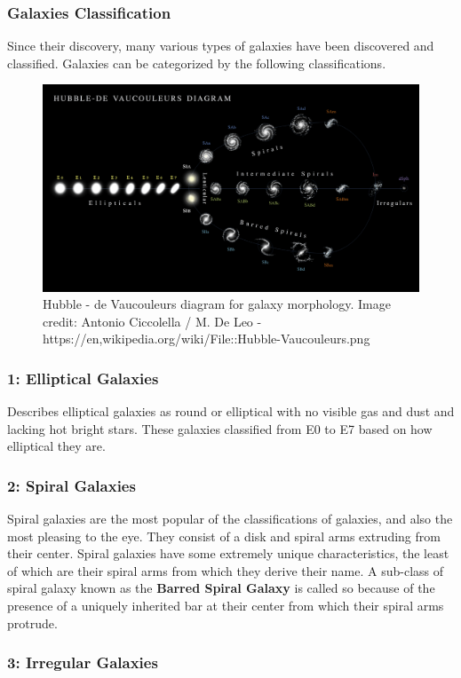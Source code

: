 \documentclass[12pt, oneside]{smuthesis}
\begin{document}
\subsubsection{\sc Galaxies Classification}
Since their discovery, many various types of galaxies have been discovered and classified. Galaxies can be categorized by the following classifications.
\begin{figure}
	\includegraphics[width=\textwidth]{GalaxyClassification}
	\caption{Hubble - de Vaucouleurs diagram for galaxy morphology. Image credit: Antonio Ciccolella / M. De Leo - https://en,wikipedia.org/wiki/File::Hubble-Vaucouleurs.png}
\end{figure}
\subsubsection{1: Elliptical Galaxies}
\cite{sag} Describes elliptical galaxies as round or elliptical with no visible gas and dust and lacking hot bright stars. These galaxies classified from E0 to E7 based on how elliptical they are.
\subsubsection{2: Spiral Galaxies}
Spiral galaxies are the most popular of the classifications of galaxies, and also the most pleasing to the eye. They consist of a disk and spiral arms extruding from their center. Spiral galaxies have some extremely unique characteristics, the least of which are their spiral arms from which they derive their name. A sub-class of spiral galaxy known as the \textbf{Barred Spiral Galaxy} is called so because of the presence of a uniquely inherited bar at their center from which their spiral arms protrude.
\subsubsection{3: Irregular Galaxies}
\end{document}
